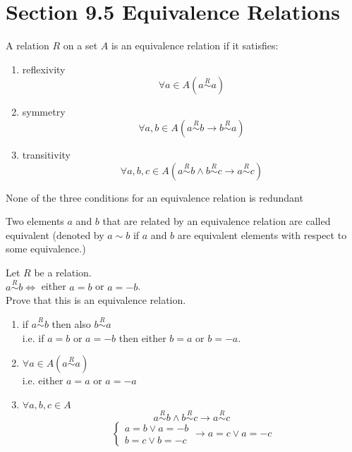 \documentclass[letterpaper, 12pt]{article}
\newenvironment{definition}[1][Definition]{\begin{trivlist}
\item[\hskip \labelsep {\bfseries #1}]}{\end{trivlist}}
\newenvironment{example}[1][Example]{\begin{trivlist}
\item[\hskip \labelsep {\bfseries #1}]}{\end{trivlist}}
\newenvironment{remark}[1][Remark]{\begin{trivlist}
\item[\hskip \labelsep {\bfseries #1}]}{\end{trivlist}}
\newcommand{\then}{\rightarrow}
\newcommand{\0}{\emptyset}
\begin{document}
    \section*{Section 9.5 Equivalence Relations}
    \begin{definition}
        A relation $R$ on a set $A$ is an equivalence relation if it satisfies:
        \begin{enumerate}
            \item reflexivity
            \[\forall a \in A (a \overset{R}{\sim} a)\]
            \item symmetry
            \[\forall a, b \in A (a \overset{R}{\sim} b \then b \overset{R}{\sim} a)\]
            \item transitivity
            \[\forall a, b, c \in A 
            (a \overset{R}{\sim} b \wedge b \overset{R}{\sim} c \then a \overset{R}{\sim} c)\]
        \end{enumerate}
    \end{definition}
    \begin{remark}
        None of the three conditions for an equivalence relation is redundant
    \end{remark}
    \begin{definition}
        Two elements $a$ and $b$ that are related by an equivalence relation are called equivalent 
        (denoted by $a \sim b$ if $a$ and $b$ are equivalent elements with respect to some 
        equivalence.)
    \end{definition}
    \begin{example}
        Let $R$ be a relation. \\
        $a \overset{R}{\sim} b \iff$ either $a=b$ or $a=-b$. \\
        Prove that this is an equivalence relation.
        \begin{enumerate}
            \item if $a \overset{R}{\sim} b$ then also $b \overset{R}{\sim} a$\\
            i.e. if $a = b$ or $a=-b$ then either $b=a$ or $b=-a$.
            \item $\forall a \in A (a \overset{R}{\sim} a)$ \\
            i.e. either $a=a$ or $a=-a$
            \item $\forall a, b, c \in A$
            \[a \overset{R}{\sim} b \wedge b \overset{R}{\sim} c \then a \overset{R}{\sim} c\]
            \[\begin{cases}
                a = b \vee a = -b \\
                b=c \vee b=-c
            \end{cases} \then a = c \vee a = -c\]
        \end{enumerate}
    \end{example}
\end{document}
